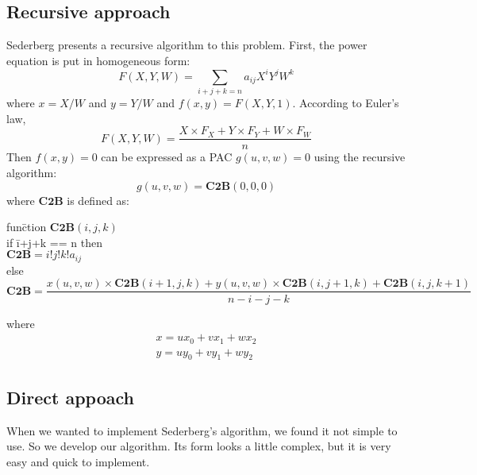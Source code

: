 \documentclass[reqno]{amsart}
\theoremstyle{plain}
\begin{document}
\begin{enumerate}
\subsection{Recursive approach}
 Sederberg\cite{h1} presents a recursive algorithm to this
problem. First, the power equation is put in homogeneous form:
\[
 F(X,Y,W) = \sum_{i+j+k=n}a_{ij}X^{i}Y^{j}W^{k}
\]
where $x=X/W$ and $y=Y/W$ and $f(x,y)=F(X,Y,1)$.  According to
Euler's law,
\[
F(X,Y,W)=\frac{X\times F_{X}+Y\times F_{Y} + W \times F_{W} }{n}
\]
Then $f(x,y)=0$ can be expressed as a PAC $g(u,v,w)=0$ using the
recursive algorithm:
\[
  g(u,v,w)=\mathbf{C2B}(0,0,0)
\]
where $\mathbf{C2B}$ is defined as:
\begin{tabbing}

    fun\=ction $\mathbf{C2B}(i,j,k)$\\
       \>if \=i+j+k == n then  \\
       \>   \> $\mathbf{C2B} = i!j!k!a_{ij}$\\
       \>else  \\
       \>   \> $\mathbf{C2B} = \dfrac{x(u,v,w)\times \mathbf{C2B}(i+1,j,k) + y(u,v,w)\times \mathbf{C2B}(i,j+1,k)+\mathbf{C2B}(i,j,k+1)
       }{n-i-j-k}$
\end{tabbing}
where
\begin{align*}
x = ux_{0} + vx_{1} + wx_{2} \\
y = uy_{0} + vy_{1} + wy_{2}
\end{align*}

\subsection{Direct appoach}
When we wanted to implement Sederberg's algorithm, we found
it not simple to use.  So we develop our algorithm. Its form looks
a little complex, but it is very easy and quick to implement.


\end{enumerate}
\end{document}
